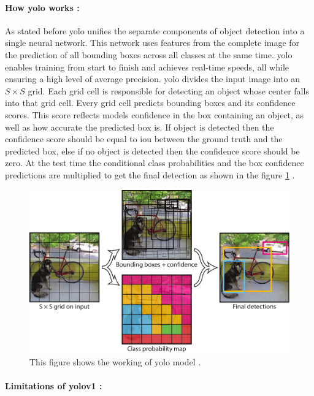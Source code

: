 \paragraph*{ How \gls{yolo} works :}

As stated before \gls{yolo} unifies the separate components of object detection into a single neural network. This network uses features from the complete image for the prediction of all bounding boxes across all classes at the same time. \gls{yolo} enables training from start to finish and achieves real-time speeds, all while ensuring a high level of average precision. \gls{yolo} divides the input image into an $S\times S$ grid. Each grid cell is responsible for detecting an object whose center falls into that grid cell. Every grid cell predicts bounding boxes and its confidence scores. This score reflects models confidence in the box containing an object, as well as how accurate the predicted box is. If object is detected then the confidence score should be equal to \gls{iou} between the ground truth and the predicted box, else if no object is detected then the confidence score should be zero. At the test time the conditional class probabilities and the box confidence predictions are multiplied to get the final detection as shown in the figure \ref{fig:yolo model} \cite{redmon2016you}.

\begin{figure}[H]
    \centering
    \includegraphics[width=1\linewidth]{Rohit_Master_Thesis//Images/yolo_model.pdf}
    \caption{This figure shows the working of \gls{yolo} model \cite{redmon2016you}.}
    \label{fig:yolo model}
\end{figure}

\paragraph*{Limitations of \gls{yolo}v1 :} 


